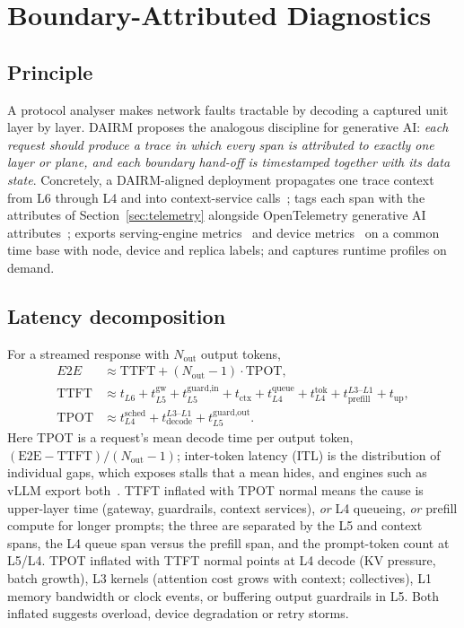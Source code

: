 \documentclass[11pt]{article}
\begin{document}
\section{Boundary-Attributed Diagnostics}
\label{sec:diag}

\subsection{Principle}
A protocol analyser makes network faults tractable by decoding a captured unit layer by layer. DAIRM proposes the analogous discipline for generative AI: \emph{each request should produce a trace in which every span is attributed to exactly one layer or plane, and each boundary hand-off is timestamped together with its data state}. Concretely, a DAIRM-aligned deployment propagates one trace context from L6 through L4 and into context-service calls~\cite{w3ctracecontext,sigelman2010dapper}; tags each span with the attributes of Section~\ref{sec:telemetry} alongside OpenTelemetry generative AI attributes~\cite{otelgenai}; exports serving-engine metrics~\cite{vllmmetrics} and device metrics~\cite{dcgmfields} on a common time base with node, device and replica labels; and captures runtime profiles on demand.

\subsection{Latency decomposition}
For a streamed response with $N_{\text{out}}$ output tokens,
\begin{align}
E2E &\approx \text{TTFT} + (N_{\text{out}}-1)\cdot\text{TPOT},\\
\text{TTFT} &\approx t_{L6} + t_{L5}^{\text{gw}} + t_{L5}^{\text{guard,in}} + t_{\text{ctx}} + t_{L4}^{\text{queue}} + t_{L4}^{\text{tok}} + t_{\text{prefill}}^{L3\text{--}L1} + t_{\text{up}},\\
\text{TPOT} &\approx t_{L4}^{\text{sched}} + t_{\text{decode}}^{L3\text{--}L1} + t_{L5}^{\text{guard,out}}.
\end{align}
Here TPOT is a request's mean decode time per output token, $(\text{E2E}-\text{TTFT})/(N_{\text{out}}-1)$; inter-token latency (ITL) is the distribution of individual gaps, which exposes stalls that a mean hides, and engines such as vLLM export both~\cite{vllmmetrics}. TTFT inflated with TPOT normal means the cause is upper-layer time (gateway, guardrails, context services), \emph{or} L4 queueing, \emph{or} prefill compute for longer prompts; the three are separated by the L5 and context spans, the L4 queue span versus the prefill span, and the prompt-token count at L5/L4. TPOT inflated with TTFT normal points at L4 decode (KV pressure, batch growth), L3 kernels (attention cost grows with context; collectives), L1 memory bandwidth or clock events, or buffering output guardrails in L5. Both inflated suggests overload, device degradation or retry storms.
\end{document}
